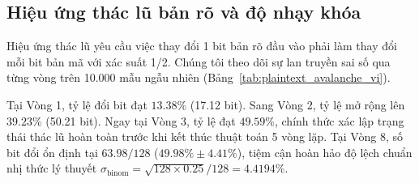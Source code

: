 \documentclass[10pt,twocolumn]{article}
\begin{document}
\subsection{Hiệu ứng thác lũ bản rõ và độ nhạy khóa}
\label{subsec:avalanche_sensitivity_vi}
Hiệu ứng thác lũ yêu cầu việc thay đổi 1 bit bản rõ đầu vào phải làm thay đổi mỗi bit bản mã với xác suất 1/2. Chúng tôi theo dõi sự lan truyền sai số qua từng vòng trên 10.000 mẫu ngẫu nhiên (Bảng~\ref{tab:plaintext_avalanche_vi}).

\begin{table}[htbp]
\caption{Sự lan truyền hiệu ứng thác lũ bản rõ qua 8 vòng (10.000 lần thử).}
\label{tab:plaintext_avalanche_vi}
\centering
\small
{}
\end{table}

Tại Vòng 1, tỷ lệ đổi bit đạt $13.38\%$ (17.12 bit). Sang Vòng 2, tỷ lệ mở rộng lên $39.23\%$ (50.21 bit). Ngay tại Vòng 3, tỷ lệ đạt $49.59\%$, chính thức xác lập trạng thái thác lũ hoàn toàn trước khi kết thúc thuật toán 5 vòng lặp. Tại Vòng 8, số bit đổi ổn định tại $63.98 / 128$ ($49.98\% \pm 4.41\%$), tiệm cận hoàn hảo độ lệch chuẩn nhị thức lý thuyết $\sigma_{\text{binom}} = \sqrt{128 \times 0.25} / 128 = 4.4194\%$.
\end{document}
